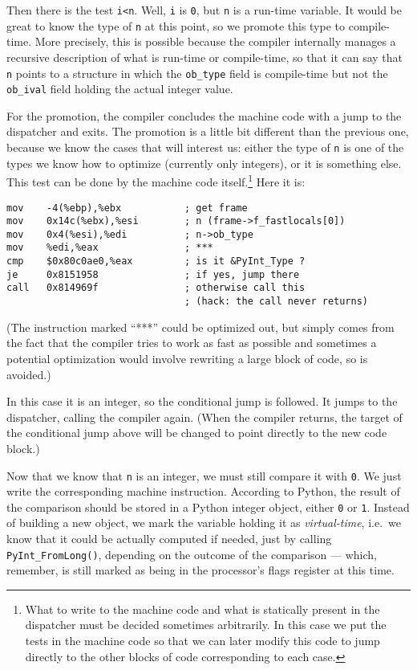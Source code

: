 \documentclass{article}
\def\code#1{\texttt{#1}}
\begin{document}
Then there is the test \code{i<n}. Well, \code{i} is \code{0}, but \code{n} is a run-time variable. It would be great to know the type of \code{n} at this point, so we promote this type to compile-time. More precisely, this is possible because the compiler internally manages a recursive description of what is run-time or compile-time, so that it can say that \code{n} points to a structure in which the \code{ob\_type} field is compile-time but not the \code{ob\_ival} field holding the actual integer value.

For the promotion, the compiler concludes the machine code with a jump to the dispatcher and exits. The promotion is a little bit different than the previous one, because we know the cases that will interest us: either the type of \code{n} is one of the types we know how to optimize (currently only integers), or it is something else. This test can be done by the machine code itself.\footnote{What to write to the machine code and what is statically present in the dispatcher must be decided sometimes arbitrarily. In this case we put the tests in the machine code so that we can later modify this code to jump directly to the other blocks of code corresponding to each case.} Here it is:

\begin{verbatim}
mov    -4(%ebp),%ebx           ; get frame
mov    0x14c(%ebx),%esi        ; n (frame->f_fastlocals[0])
mov    0x4(%esi),%edi          ; n->ob_type
mov    %edi,%eax               ; ***
cmp    $0x80c0ae0,%eax         ; is it &PyInt_Type ?
je     0x8151958               ; if yes, jump there
call   0x814969f               ; otherwise call this
                               ; (hack: the call never returns)
\end{verbatim}

(The instruction marked ``***'' could be optimized out, but simply comes from the fact that the compiler tries to work as fast as possible and sometimes a potential optimization would involve rewriting a large block of code, so is avoided.)

In this case it is an integer, so the conditional jump is followed. It jumps to the dispatcher, calling the compiler again. (When the compiler returns, the target of the conditional jump above will be changed to point directly to the new code block.)

Now that we know that \code{n} is an integer, we must still compare it with \code{0}. We just write the corresponding machine instruction. According to Python, the result of the comparison should be stored in a Python integer object, either \code{0} or \code{1}. Instead of building a new object, we mark the variable holding it as \emph{virtual-time}, i.e.\ we know that it could be actually computed if needed, just by calling \code{PyInt\_FromLong()}, depending on the outcome of the comparison --- which, remember, is still marked as being in the processor's flags register at this time.
\end{document}
